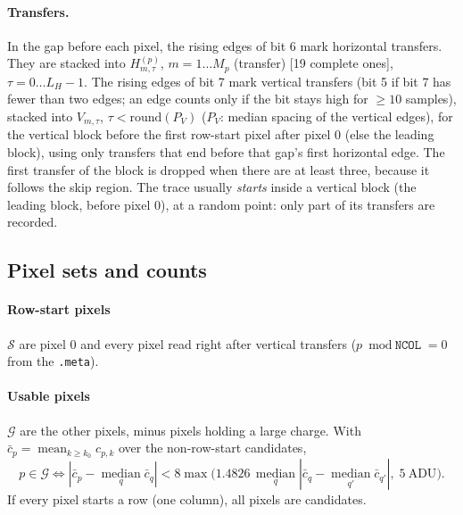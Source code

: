 \documentclass[10pt]{article}
\newcommand{\code}[1]{\texttt{#1}}
\newcommand{\med}{\operatorname*{median}}
\newcommand{\mean}{\operatorname*{mean}}
\newcommand{\ko}{k_0}
\newcommand{\G}{\mathcal G}
\begin{document}
\paragraph{Transfers.} In the gap before each pixel, the rising edges of bit 6 mark horizontal transfers. They are stacked into
$H^{(p)}_{m,\tau}$, $m = 1\dots M_p$ (transfer) [19 complete ones], $\tau = 0\dots L_H - 1$. The rising edges of bit 7 mark vertical
transfers (bit 5 if bit 7 has fewer than two edges; an edge counts only if the bit stays high for $\ge 10$ samples), stacked into
$V_{m,\tau}$, $\tau < \mathrm{round}(P_V)$ ($P_V$: median spacing of the vertical edges), for the vertical block before the first row-start
pixel after pixel 0 (else the leading block), using only transfers that end before that gap's first horizontal edge. The first transfer
of the block is dropped when there are at least three, because it follows the skip region. The trace usually \emph{starts} inside a vertical
block (the leading block, before pixel 0), at a random point: only part of its transfers are recorded.

\subsection{Pixel sets and counts}
\paragraph{Row-start pixels} $\mathcal S$ are pixel 0 and every pixel read right after vertical transfers ($p \bmod \code{NCOL} = 0$ from
the \code{.meta}).

\paragraph{Usable pixels} $\G$ are the other pixels, minus pixels holding a large charge. With
$\bar c_p = \mean_{k \ge \ko} c_{p,k}$ over the non-row-start candidates,
\begin{equation}
p \in \G \iff |\bar c_p - \med_q \bar c_q| < 8 \max\bigl(1.4826\,\med_q |\bar c_q - \med_{q'} \bar c_{q'}|,\; 5\ \text{ADU}\bigr).
\end{equation}
If every pixel starts a row (one column), all pixels are candidates.
\end{document}
